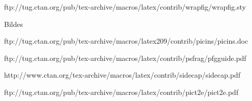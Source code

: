 %
ftp://tug.ctan.org/pub/tex-archive/macros/latex/contrib/wrapfig/wrapfig.sty
\usepackage{wrapfig} %
\setlength{\intextsep}{0.5\baselineskip} %
Bildes


ftp://tug.ctan.org/pub/tex-archive/macros/latex209/contrib/picins/picins.doc


\renewcommand{\floatpagefraction}{.75} %
\renewcommand{\textfraction}{.1} %
\renewcommand{\topfraction}{.8} %
\renewcommand{\bottomfraction}{.5} %
\setcounter{topnumber}{3} %
\setcounter{bottomnumber}{2} %
\setcounter{totalnumber}{5} %


ftp://tug.ctan.org/pub/tex-archive/macros/latex/contrib/psfrag/pfgguide.pdf


http://www.ctan.org/tex-archive/macros/latex/contrib/sidecap/sidecap.pdf
\usepackage[%
rightcaption,%
ragged,%
]{sidecap}

\renewcommand\sidecaptionsep{2em}


%

ftp://tug.ctan.org/pub/tex-archive/macros/latex/contrib/pict2e/pict2e.pdf
%

